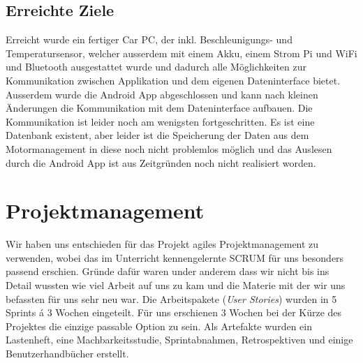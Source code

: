 \subsection{Erreichte Ziele}
Erreicht wurde ein fertiger Car PC, der inkl. Beschleunigungs- und Temperatursensor, welcher ausserdem mit einem Akku, einem Strom Pi und WiFi und Bluetooth ausgestattet wurde und dadurch alle Möglichkeiten zur Kommunikation zwischen Applikation und dem eigenen Dateninterface bietet.
Ausserdem wurde die Android App abgeschlossen und kann nach kleinen Änderungen die Kommunikation mit dem Dateninterface aufbauen.
Die Kommunikation ist leider noch am wenigsten fortgeschritten. Es ist eine Datenbank existent, aber leider ist die Speicherung der Daten aus dem Motormanagement in diese noch nicht problemlos möglich und das Auslesen durch die Android App ist aus Zeitgründen noch nicht realisiert worden.


\section{Projektmanagement}
Wir haben uns entschieden für das Projekt agiles Projektmanagement zu verwenden, wobei das im Unterricht kennengelernte SCRUM für uns besonders passend erschien. Gründe dafür waren under anderem dass wir nicht bis ins Detail wussten wie viel Arbeit auf uns zu kam und die Materie mit der wir uns befassten für uns sehr neu war.
\newline
Die Arbeitspakete (\textit{User Stories}) wurden in 5 Sprints á 3 Wochen eingeteilt. Für uns erschienen 3 Wochen bei der Kürze des Projektes die einzige passable Option zu sein.
Als Artefakte wurden ein Lastenheft, eine Machbarkeitsstudie, Sprintabnahmen, Retrospektiven und einige Benutzerhandbücher erstellt.